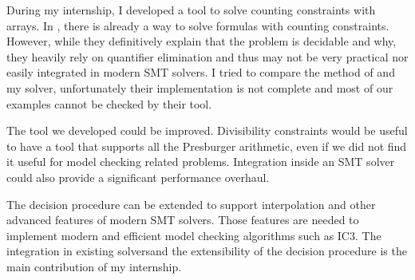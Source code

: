 
During my internship, I developed a tool to solve counting constraints with
arrays. In \cite{AlbertiGP16, schweikardt}, there is already a way to solve
formulas with counting constraints. However, while they definitively explain that the problem
is decidable and why, they heavily rely on quantifier elimination and
thus may not be very practical nor easily integrated in modern SMT
solvers. I tried to compare the method of \cite{AlbertiGP16} and my solver,
unfortunately their implementation is not complete and most of our examples
cannot be checked by their tool.

The tool we developed could be improved. Divisibility constraints would be
useful to have a tool that supports all the Presburger arithmetic, even if we
did not find it useful for model checking related problems. Integration inside
an SMT solver could also provide a significant performance overhaul.

The decision procedure can be extended to support
interpolation and other advanced features of modern SMT solvers. Those features
are needed to implement modern and efficient model checking algorithms such as
IC3. The integration in existing solversand the extensibility of the decision
procedure is the main contribution of my internship.
